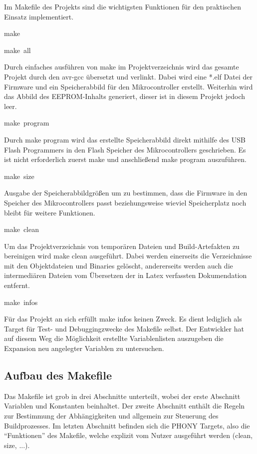 Im Makefile des Projekts sind die wichtigsten Funktionen für den praktischen
Einsatz implementiert. 
\begin{lyxcode}
make

make~all
\end{lyxcode}
Durch einfaches ausführen von make im Projektverzeichnis wird das
gesamte Projekt durch den avr-gcc übersetzt und verlinkt. Dabei wird
eine {*}.elf Datei der Firmware und ein Speicherabbild für den Mikrocontroller
erstellt. Weiterhin wird das Abbild des EEPROM-Inhalts generiert,
dieser ist in diesem Projekt jedoch leer.
\begin{lyxcode}
make~program
\end{lyxcode}
Durch make program wird das erstellte Speicherabbild direkt mithilfe
des USB Flash Programmers in den Flash Speicher des Mikrocontrollers
geschrieben. Es ist nicht erforderlich zuerst make und anschließend
make program auszuführen.
\begin{lyxcode}
make~size
\end{lyxcode}
Ausgabe der Speicherabbildgrößen um zu bestimmen, dass die Firmware
in den Speicher des Mikrocontrollers passt beziehungsweise wieviel
Speicherplatz noch bleibt für weitere Funktionen.
\begin{lyxcode}
make~clean
\end{lyxcode}
Um das Projektverzeichnis von temporären Dateien und Build-Artefakten
zu bereinigen wird make clean ausgeführt. Dabei werden einerseits
die Verzeichnisse mit den Objektdateien und Binaries gelöscht, andererseits
werden auch die intermediären Dateien vom Übersetzen der in Latex
verfassten Dokumendation entfernt.
\begin{lyxcode}
make~infos
\end{lyxcode}
Für das Projekt an sich erfüllt make infos keinen Zweck. Es dient
lediglich als Target für Test- und Debuggingzwecke des Makefile selbst.
Der Entwickler hat auf diesem Weg die Möglichkeit erstellte Variablenlisten
auszugeben die Expansion neu angelegter Variablen zu untersuchen.

\subsection*{Aufbau des Makefile}

Das Makefile ist grob in drei Abschnitte unterteilt, wobei der erste
Abschnitt Variablen und Konstanten beinhaltet. Der zweite Abschnitt
enthält die Regeln zur Bestimmung der Abhängigkeiten und allgemein
zur Steuerung des Buildprozesses. Im letzten Abschnitt befinden sich
die PHONY Targets, also die ``Funktionen'' des Makefile, welche
explizit vom Nutzer ausgeführt werden (clean, size, ...).

